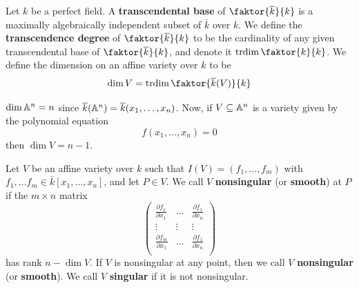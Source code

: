 \begin{definition}
    Let $k$ be a perfect field. A  \textbf{transcendental base} of
    $\faktor{\bar{k}}{k}$ is a maximally algebraically independent subset of
    $\bar{k}$ over $k$. We define the \textbf{transcendence degree} of
    $\faktor{\bar{k}}{k}$ to be the cardinality of any given transcendental base
    of $\faktor{\bar{k}}{k}$, and denote it $\trdim{\faktor{k}{k}}$. We define
    the dimension on an affine variety over $k$ to be
    \begin{equation*}
        \dim{V}=\trdim{\faktor{\bar{k}(V)}{k}}
    \end{equation*}
\end{definition}

\begin{example}\label{example_1.2}
    $\operatorname{dim}{\mathbb{A}^n}=n$ since $\overline{k}(\mathbb{A}^n)=\overline{k}(x_1, \dots, x_n)$. Now, if $V
    \subseteq \mathbb{A}^n$ is a variety given by the polynomial equation
    \begin{equation*}
        f(x_1, \dots, x_n)=0
    \end{equation*}
    then $\dim{V}=n-1$.
\end{example}

\begin{definition}
    Let $V$ be an affine variety over $k$ such that $I(V)=(f_1, \dots ,f_m)$
    with $f_1, \dots f_m \in \bar{k}[x_1, \dots, x_n]$, and let $P \in V$. We
    call  $V$  \textbf{nonsingular} (or \textbf{smooth}) at $P$ if the  $m
    \times n$ matrix
\begin{equation*}
\begin{pmatrix}
\frac{\partial{f_1}}{\partial{x_1}} & \dots & \frac{\partial{f_1}}{\partial{x_n}}   \\
\vdots  &   \vdots  &   \vdots  \\
\frac{\partial{f_m}}{\partial{x_1}} & \dots & \frac{\partial{f_1}}{\partial{x_n}}   \\
\end{pmatrix}
\end{equation*}
    has rank $n-\dim{V}$. If $V$ is nonsingular at any point, then we call  $V$
    \textbf{nonsingular} (or \textbf{smooth}). We call $V$  \textbf{singular} if
    it is not nonsingular.
\end{definition}


